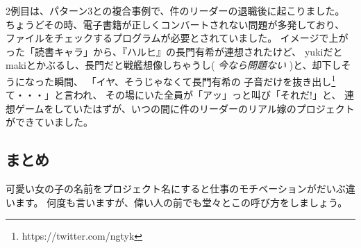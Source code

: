 2例目は、パターン3との複合事例で、件のリーダーの退職後に起こりました。
ちょうどその時、電子書籍が正しくコンバートされない問題が多発しており、
ファイルをチェックするプログラムが必要とされていました。
イメージで上がった「読書キャラ」から、『ハルヒ』の長門有希が連想されたけど、
yukiだとmakiとかぶるし、長門だと戦艦想像しちゃうし(
\emph{今なら問題ない} )と、却下しそうになった瞬間、
「イヤ、そうじゃなくて長門有希の
子音だけを抜き出し\footnote{https://twitter.com/ngtyk}て・・・」と言われ、
 その場にいた全員が「アッ」っと叫び「それだ!」と、
連想ゲームをしていたはずが、いつの間に件のリーダーのリアル嫁のプロジェクトができていました。

\subsection{まとめ}

可愛い女の子の名前をプロジェクト名にすると仕事のモチベーションがだいぶ違います。
何度も言いますが、偉い人の前でも堂々とこの呼び方をしましょう。
